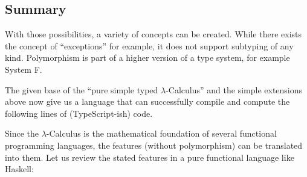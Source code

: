 \subsection{Summary}

With those possibilities, a variety of concepts can be created.
While there exists the concept of ``exceptions'' for example, it does
not support subtyping of any kind. Polymorphism is part of a higher
version of a type system, for example System F.


The given base of the ``pure simple typed $\lambda$-Calculus'' and
the simple extensions above now give us a language that can successfully compile
and compute the following lines of (TypeScript-ish) code.


Since the $\lambda$-Calculus is the mathematical foundation of several functional
programming languages, the features (without polymorphism) can be translated
into them. Let us review the stated features in a pure functional language
like Haskell:

